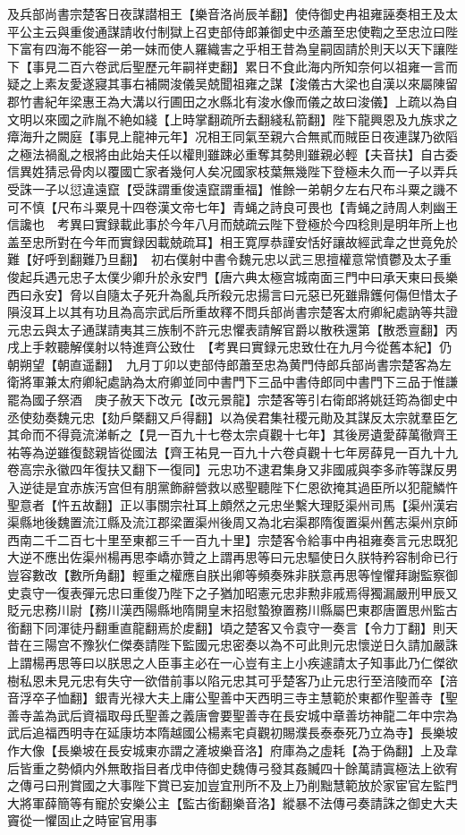 及兵部尚書宗楚客日夜謀譛相王【樂音洛尚辰羊翻】使侍御史冉祖雍誣奏相王及太平公主云與重俊通謀請收付制獄上召吏部侍郎兼御史中丞蕭至忠使鞫之至忠泣曰陛下富有四海不能容一弟一妹而使人羅織害之乎相王昔為皇嗣固請於則天以天下讓陛下【事見二百六卷武后聖歷元年嗣祥吏翻】累日不食此海内所知奈何以祖雍一言而疑之上素友愛遂寢其事右補闕浚儀吴兢聞祖雍之謀【浚儀古大梁也自漢以來屬陳留郡竹書紀年梁惠王為大溝以行圃田之水縣北有浚水像而儀之故曰浚儀】上疏以為自文明以來國之祚胤不絶如綫【上時掌翻疏所去翻綫私箭翻】陛下龍興恩及九族求之瘴海升之闕庭【事見上龍神元年】况相王同氣至親六合無貳而賊臣日夜連謀乃欲䧟之極法禍亂之根將由此始夫任以權則雖踈必重奪其勢則雖親必輕【夫音扶】自古委信異姓猜忌骨肉以覆國亡家者幾何人矣况國家枝葉無幾陛下登極未久而一子以弄兵受誅一子以愆違遠竄【受誅謂重俊遠竄謂重福】惟餘一弟朝夕左右尺布斗粟之譏不可不慎【尺布斗粟見十四卷漢文帝七年】青蝇之詩良可畏也【青蝇之詩周人刺幽王信讒也　考異曰實録載此事於今年八月而兢疏云陛下登極於今四稔則是明年所上也盖至忠所對在今年而實録因載兢疏耳】相王寛厚恭謹安恬好讓故經武韋之世竟免於難【好呼到翻難乃旦翻】　初右僕射中書令魏元忠以武三思擅權意常憤鬱及太子重俊起兵遇元忠子太僕少卿升於永安門【唐六典太極宫城南面三門中曰承天東曰長樂西曰永安】脅以自隨太子死升為亂兵所殺元忠揚言曰元惡已死雖鼎鑊何傷但惜太子隕沒耳上以其有功且為高宗武后所重故釋不問兵部尚書宗楚客太府卿紀處訥等共證元忠云與太子通謀請夷其三族制不許元忠懼表請解官爵以散秩還第【散悉亶翻】丙戌上手敕聽解僕射以特進齊公致仕　【考異曰實録元忠致仕在九月今從舊本紀】仍朝朔望【朝直遥翻】　九月丁卯以吏部侍郎蕭至忠為黄門侍郎兵部尚書宗楚客為左衛將軍兼太府卿紀處訥為太府卿並同中書門下三品中書侍郎同中書門下三品于惟謙罷為國子祭酒　庚子赦天下改元【改元景龍】宗楚客等引右衛郎將姚廷筠為御史中丞使劾奏魏元忠【劾戶槩翻又戶得翻】以為侯君集社稷元勛及其謀反太宗就羣臣乞其命而不得竟流涕斬之【見一百九十七卷太宗貞觀十七年】其後房遺愛薛萬徹齊王祐等為逆雖復懿親皆從國法【齊王祐見一百九十六卷貞觀十七年房薛見一百九十九卷高宗永徽四年復扶又翻下一復同】元忠功不逮君集身又非國戚與李多祚等謀反男入逆徒是宜赤族汚宫但有朋黨飾辭營救以惑聖聽陛下仁恩欲掩其過臣所以犯龍鱗忤聖意者【忤五故翻】正以事關宗社耳上頗然之元忠坐繫大理貶渠州司馬【渠州漢宕渠縣地後魏置流江縣及流江郡梁置渠州後周又為北宕渠郡隋復置渠州舊志渠州京師西南二千二百七十里至東都三千一百九十里】宗楚客令給事中冉祖雍奏言元忠既犯大逆不應出佐渠州楊再思李嶠亦贊之上謂再思等曰元忠驅使日久朕特矜容制命已行豈容數改【數所角翻】輕重之權應自朕出卿等頻奏殊非朕意再思等惶懼拜謝監察御史袁守一復表彈元忠曰重俊乃陛下之子猶加昭憲元忠非勲非戚焉得獨漏嚴刑甲辰又貶元忠務川尉【務川漢西陽縣地隋開皇末招慰蟄獠置務川縣屬巴東郡唐置思州監古銜翻下同渾徒丹翻重直龍翻焉於䖍翻】頃之楚客又令袁守一奏言【令力丁翻】則天昔在三陽宫不豫狄仁傑奏請陛下監國元忠密奏以為不可此則元忠懷逆日久請加嚴誅上謂楊再思等曰以朕思之人臣事主必在一心豈有主上小疾遽請太子知事此乃仁傑欲樹私恩未見元忠有失守一欲借前事以陷元忠其可乎楚客乃止元忠行至涪陵而卒【涪音浮卒子恤翻】銀青光禄大夫上庸公聖善中天西明三寺主慧範於東都作聖善寺【聖善寺盖為武后資福取母氏聖善之義唐會要聖善寺在長安城中章善坊神龍二年中宗為武后追福西明寺在延康坊本隋越國公楊素宅貞觀初賜濮長泰泰死乃立為寺】長樂坡作大像【長樂坡在長安城東亦謂之滻坡樂音洛】府庫為之虛耗【為于偽翻】上及韋后皆重之勢傾内外無敢指目者戊申侍御史魏傳弓發其姦贓四十餘萬請寘極法上欲宥之傳弓曰刑賞國之大事陛下賞已妄加豈宜刑所不及上乃削黜慧範放於家宦官左監門大將軍薛簡等有寵於安樂公主【監古銜翻樂音洛】縱暴不法傳弓奏請誅之御史大夫竇從一懼固止之時宦官用事